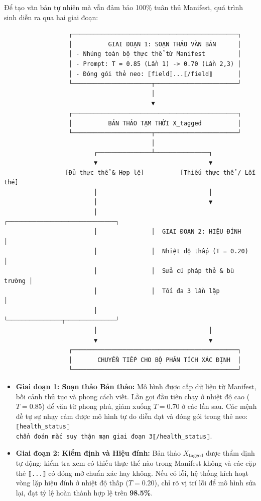 \documentclass[
  11pt,
  a4paper,
]{article}
\providecommand{\tightlist}{%
  \setlength{\itemsep}{0pt}\setlength{\parskip}{0pt}}
\begin{document}
Để tạo văn bản tự nhiên mà vẫn đảm bảo 100\% tuân thủ Manifest, quá trình sinh diễn ra qua hai giai
đoạn:

\begin{verbatim}
                  ┌──────────────────────────────────────────────┐
                  │          GIAI ĐOẠN 1: SOẠN THẢO VĂN BẢN      │
                  │ - Nhúng toàn bộ thực thể từ Manifest         │
                  │ - Prompt: T = 0.85 (Lần 1) -> 0.70 (Lần 2,3) │
                  │ - Đóng gói thẻ neo: ⟦field⟧...⟦/field⟧       │
                  └──────────────────────┬───────────────────────┘
                                         │
                                         ▼
                  ┌──────────────────────────────────────────────┐
                  │          BẢN THẢO TẠM THỜI X_tagged          │
                  └──────────────────────┬───────────────────────┘
                                         │
                         ┌───────────────┴───────────────┐
                         ▼                               ▼
                 [Đủ thực thể & Hợp lệ]          [Thiếu thực thể / Lỗi thẻ]
                         │                               │
                         │                               ▼
                         │               ┌──────────────────────────────┐
                         │               │  GIAI ĐOẠN 2: HIỆU ĐÍNH      │
                         │               │  Nhiệt độ thấp (T = 0.20)    │
                         │               │  Sửa cú pháp thẻ & bù trường │
                         │               │  Tối đa 3 lần lặp            │
                         │               └───────────────┬──────────────┘
                         │                               │
                         ▼                               ▼
                  ┌──────────────────────────────────────────────┐
                  │       CHUYỂN TIẾP CHO BỘ PHÂN TÍCH XÁC ĐỊNH  │
                  └──────────────────────────────────────────────┘
\end{verbatim}

\begin{itemize}
\tightlist
\item
  \textbf{Giai đoạn 1: Soạn thảo Bản thảo:} Mô hình được cấp dữ liệu từ Manifest, bối cảnh thủ tục
  và phong cách viết. Lần gọi đầu tiên chạy ở nhiệt độ cao (\(T = 0.85\)) để văn từ phong phú, giảm
  xuống \(T = 0.70\) ở các lần sau. Các mệnh đề tự sự nhạy cảm được mô hình tự do diễn đạt và đóng
  gói trong thẻ neo:
  \texttt{⟦health\_status⟧chẩn\ đoán\ mắc\ suy\ thận\ mạn\ giai\ đoạn\ 3⟦/health\_status⟧}.
\item
  \textbf{Giai đoạn 2: Kiểm định và Hiệu đính:} Bản thảo \(X_{\text{tagged}}\) được thẩm định tự
  động: kiểm tra xem có thiếu thực thể nào trong Manifest không và các cặp thẻ \texttt{⟦...⟧} có
  đóng mở chuẩn xác hay không. Nếu có lỗi, hệ thống kích hoạt vòng lặp hiệu đính ở nhiệt độ thấp
  (\(T = 0.20\)), chỉ rõ vị trí lỗi để mô hình sửa lại, đạt tỷ lệ hoàn thành hợp lệ trên
  \textbf{98.5\%}.
\end{itemize}
\end{document}
